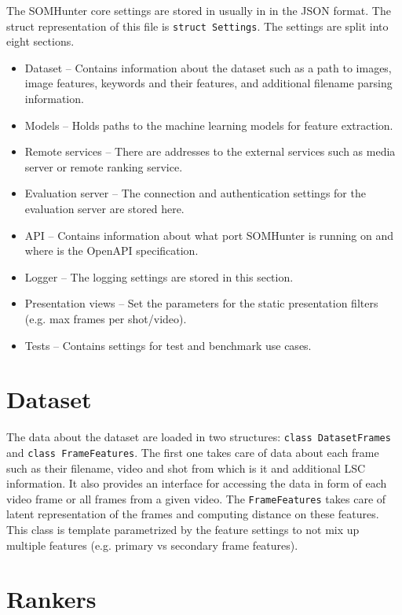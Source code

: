 The SOMHunter core settings are stored in usually in  in the JSON format. The struct representation of this file is \lstinline{struct Settings}. The settings are split into eight sections.
\begin{itemize}
  \item Dataset -- Contains information about the dataset such as a path to images, image features, keywords and their features, and additional filename parsing information. 
  \item Models -- Holds paths to the machine learning models for feature extraction.
  \item Remote services -- There are addresses to the external services such as media server or remote ranking service.
  \item Evaluation server -- The connection and authentication settings for the evaluation server are stored here.
  \item API -- Contains information about what port SOMHunter is running on and where is the OpenAPI specification.
  \item Logger -- The logging settings are stored in this section.
  \item Presentation views -- Set the parameters for the static presentation filters (e.g. max frames per shot/video).
  \item Tests -- Contains settings for test and benchmark use cases.
\end{itemize}

\section{Dataset}

The data about the dataset are loaded in two structures: \lstinline{class DatasetFrames} and \lstinline{class FrameFeatures}. The first one takes care of data about each frame such as their filename, video and shot from which is it and additional LSC information. It also provides an interface for accessing the data in form of each video frame or all frames from a given video. The \lstinline{FrameFeatures} takes care of latent representation of the frames and computing distance on these features. This class is template parametrized by the feature settings to not mix up multiple features (e.g. primary vs secondary frame features). 

\section{Rankers}

